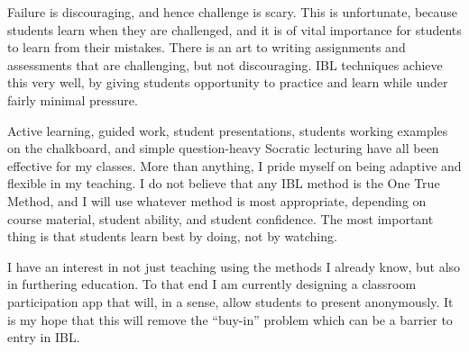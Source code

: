 \documentclass[11pt]{article}
\begin{document}
Failure is discouraging, and hence challenge is scary. This is unfortunate,
because students learn when they are challenged, and it is of vital importance
for students to learn from their mistakes. There is an art to writing
assignments and assessments that are challenging, but not discouraging. IBL
techniques achieve this very well, by giving students opportunity to practice
and learn while under fairly minimal pressure.

Active learning, guided work, student presentations, students working
examples on the chalkboard, and simple question-heavy Socratic lecturing have
all been effective for my classes. More than anything, I pride myself on being
adaptive and flexible in my teaching. I do not believe that any IBL method is
the One True Method, and I will use whatever method is most appropriate,
depending on course material, student ability, and student confidence. The most
important thing is that students learn best by doing, not by watching.

I have an interest in not just teaching using the methods I already know, but
also in furthering education. To that end I am currently designing a classroom
participation app that will, in a sense, allow students to present
anonymously. It is my hope that this will remove the ``buy-in'' problem which
can be a barrier to entry in IBL.
\end{document}
